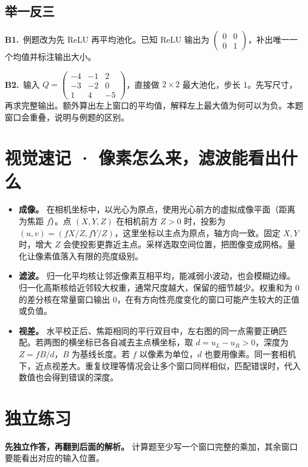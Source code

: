 \documentclass[UTF8,a4paper,11pt]{ctexart}
\newcommand{\PracticeQuestion}[3]{\par\Needspace{4\baselineskip}\noindent\begin{minipage}{\linewidth}\textbf{#1.}\ #2\par\noindent\rule{0pt}{#3mm}\par\end{minipage}\par}
\begin{document}
\subsection{举一反三}
\PracticeQuestion{B1}{例题改为先 ReLU 再平均池化。已知 ReLU 输出为 $\begin{pmatrix}0&0\\0&1\end{pmatrix}$，补出唯一一个均值并标注输出大小。}{24}
\PracticeQuestion{B2}{输入 $Q=\begin{pmatrix}-4&-1&2\\-3&-2&0\\1&4&-5\end{pmatrix}$，直接做 $2\times2$ 最大池化，步长 1。先写尺寸，再求完整输出。额外算出左上窗口的平均值，解释左上最大值为何可以为负。本题窗口会重叠，说明与例题的区别。}{34}
\clearpage
\section{视觉速记 · 像素怎么来，滤波能看出什么}
\begin{itemize}
\item \textbf{成像。} 在相机坐标中，以光心为原点，使用光心前方的虚拟成像平面（距离为焦距 $f$）。点 $(X,Y,Z)$ 在相机前方 $Z>0$ 时，投影为 $(u,v)=(fX/Z,fY/Z)$，这里坐标以主点为原点，轴方向一致。固定 $X,Y$ 时，增大 $Z$ 会使投影更靠近主点。采样选取空间位置，把图像变成网格。量化让像素值落入有限的亮度级别。
\item \textbf{滤波。} 归一化平均核让邻近像素互相平均，能减弱小波动，也会模糊边缘。归一化高斯核给近邻较大权重，通常尺度越大，保留的细节越少。权重和为 0 的差分核在常量窗口输出 0，在有方向性亮度变化的窗口可能产生较大的正值或负值。
\item \textbf{视差。} 水平校正后、焦距相同的平行双目中，左右图的同一点需要正确匹配。若两图的横坐标已各自减去主点横坐标，取 $d=u_L-u_R>0$，深度为 $Z=fB/d$，$B$ 为基线长度。若 $f$ 以像素为单位，$d$ 也要用像素。同一套相机下，近点视差大。重复纹理等情况会让多个窗口同样相似，匹配错误时，代入数值也会得到错误的深度。
\end{itemize}
\section{独立练习}
\textbf{先独立作答，再翻到后面的解析。} 计算题至少写一个窗口完整的乘加，其余窗口要能看出对应的输入位置。
\end{document}
